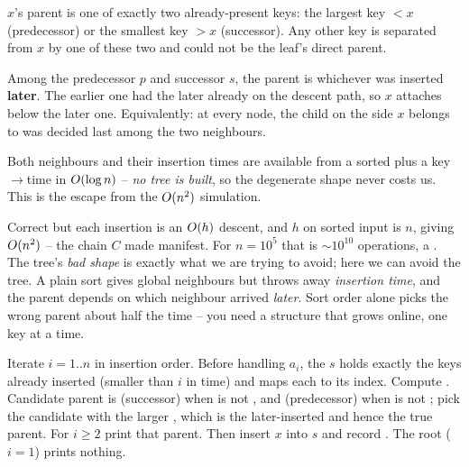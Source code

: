 \begin{observation}
$x$'s parent is one of exactly two already-present keys: the largest key $<x$ (predecessor) or the
smallest key $>x$ (successor). Any other key is separated from $x$ by one of these two and could not
be the leaf's direct parent.
\end{observation}
\begin{observation}
Among the predecessor $p$ and successor $s$, the parent is whichever was inserted \textbf{later}.
The earlier one had the later already on the descent path, so $x$ attaches below the later one.
Equivalently: at every node, the child on the side $x$ belongs to was decided last among the two
neighbours.
\end{observation}
\begin{observation}
Both neighbours and their insertion times are available from a sorted  plus a
 key$\to$time in $O(\log n)$ -- \emph{no tree is built}, so the degenerate shape never
costs us. This is the escape from the $O(n^2)$ simulation.
\end{observation}

\begin{thinkbox}
{Correct but each insertion is an $O(h)$ descent, and $h$ on sorted input is $n$, giving
$O(n^2)$ -- the chain $C$ made manifest. For $n=10^{5}$ that is $\sim 10^{10}$ operations, a
\tle. The tree's \emph{bad shape} is exactly what we are trying to avoid; here we can avoid the tree.}
{A plain sort gives global neighbours but throws away \emph{insertion time}, and the parent depends on
which neighbour arrived \emph{later}. Sort order alone picks the wrong parent about half the time --
you need a structure that grows online, one key at a time.}
\end{thinkbox}

Iterate $i=1..n$ in insertion order. Before handling $a_i$, the  $s$ holds exactly the keys
already inserted (smaller than $i$ in time) and  maps each to its index. Compute
. Candidate parent is  (successor) when  is not
, and  (predecessor) when  is not ; pick the
candidate with the larger , which
is the later-inserted and hence the true parent. For $i\ge 2$ print that parent. Then insert $x$ into
$s$ and record . The root ($i=1$) prints nothing.

